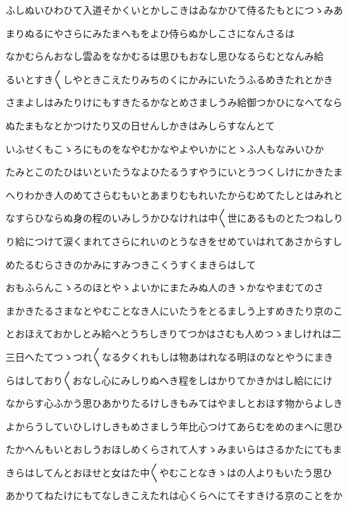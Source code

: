\documentclass[a4paper,11pt,landscape]{ltjtarticle}
\begin{document}
ふしぬいひわひて入道そかくいとかしこきはゐなかひて侍るたもとにつゝみあ
\par\medskip
まりぬるにやさらにみたまへもをよひ侍らぬかしこさになんさるは
\par\medskip
なかむらんおなし雲ゐをなかむるは思ひもおなし思ひなるらむとなんみ給
\par\medskip
るいとすき〱しやときこえたりみちのくにかみにいたうふるめきたれとかき
\par\medskip
さまよしはみたりけにもすきたるかなとめさましうみ給御つかひになへてなら
\par\medskip
ぬたまもなとかつけたり又の日せんしかきはみしらすなんとて
\par\medskip
いふせくもこゝろにものをなやむかなやよやいかにとゝふ人もなみいひか
\par\medskip
たみとこのたひはいといたうなよひたるうすやうにいとうつくしけにかきたま
\par\medskip
へりわかき人のめてさらむもいとあまりむもれいたからむめてたしとはみれと
\par\medskip
なすらひならぬ身の程のいみしうかひなけれは中〱世にあるものとたつねしり
\par\medskip
り給につけて涙くまれてさらにれいのとうなきをせめていはれてあさからすし
\par\medskip
めたるむらさきのかみにすみつきこくうすくまきらはして
\par\medskip
おもふらんこゝろのほとやゝよいかにまたみぬ人のきゝかなやまむてのさ
\par\medskip
まかきたるさまなとやむことなき人にいたうをとるましう上すめきたり京のこ
\par\medskip
とおほえておかしとみ給へとうちしきりてつかはさむも人めつゝましけれは二
\par\medskip
三日へたてつゝつれ〱なる夕くれもしは物あはれなる明ほのなとやうにまき
\par\medskip
らはしており〱おなし心にみしりぬへき程をしはかりてかきかはし給ににけ
\par\medskip
なからす心ふかう思ひあかりたるけしきもみてはやましとおほす物からよしき
\par\medskip
よからうしていひしけしきもめさましう年比心つけてあらむをめのまへに思ひ
\par\medskip
たかへんもいとおしうおほしめくらされて人すゝみまいらはさるかたにてもま
\par\medskip
きらはしてんとおほせと女はた中〱やむことなきゝはの人よりもいたう思ひ
\par\medskip
あかりてねたけにもてなしきこえたれは心くらへにてそすきける京のことをか
\end{document}
